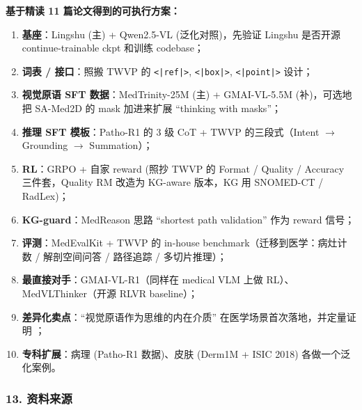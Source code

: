 \begin{summarybox}
\textbf{基于精读 11 篇论文得到的可执行方案：}
\begin{enumerate}[leftmargin=1.5em]
  \item \textbf{基座}：Lingshu (主) + Qwen2.5-VL (泛化对照)，先验证 Lingshu 是否开源 continue-trainable ckpt 和训练 codebase；
  \item \textbf{词表 / 接口}：照搬 TWVP 的 \texttt{<|ref|>}, \texttt{<|box|>}, \texttt{<|point|>} 设计；
  \item \textbf{视觉原语 SFT 数据}：MedTrinity-25M (主) + GMAI-VL-5.5M (补)，可选地把 SA-Med2D 的 mask 加进来扩展 ``thinking with masks''；
  \item \textbf{推理 SFT 模板}：Patho-R1 的 3 级 CoT + TWVP 的三段式（Intent $\to$ Grounding $\to$ Summation）；
  \item \textbf{RL}：GRPO + 自家 reward (照抄 TWVP 的 Format / Quality / Accuracy 三件套，Quality RM 改造为 KG-aware 版本，KG 用 SNOMED-CT / RadLex)；
  \item \textbf{KG-guard}：MedReason 思路 ``shortest path validation'' 作为 reward 信号；
  \item \textbf{评测}：MedEvalKit + TWVP 的 in-house benchmark（迁移到医学：病灶计数 / 解剖空间问答 / 路径追踪 / 多切片推理）；
  \item \textbf{最直接对手}：GMAI-VL-R1（同样在 medical VLM 上做 RL）、MedVLThinker（开源 RLVR baseline）；
  \item \textbf{差异化卖点}：``视觉原语作为思维的内在介质'' 在医学场景首次落地，并定量证明 ；
  \item \textbf{专科扩展}：病理 (Patho-R1 数据)、皮肤 (Derm1M + ISIC 2018) 各做一个泛化案例。
\end{enumerate}
\end{summarybox}

\subsubsection*{13. 资料来源}


